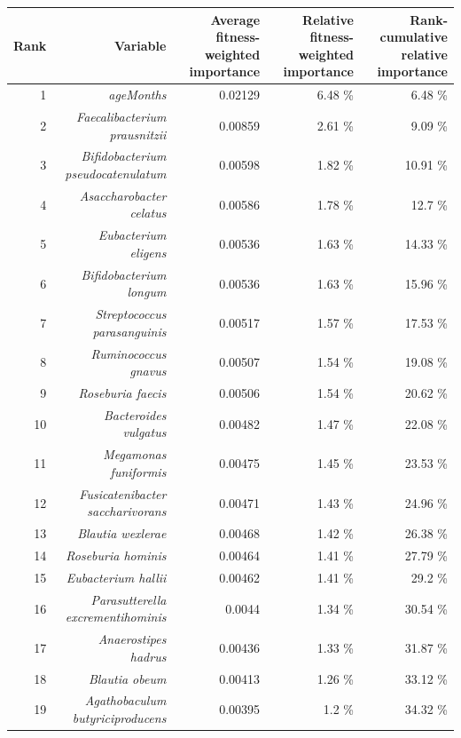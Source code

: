 \documentclass{article}
\begin{document}
\begin{table}[h]
  \begin{centering}
    \tiny
    \begin{tabular}{|r|r|r|r|r|}
      \hline\hline
      \textbf{Rank} & \textbf{Variable} & \textbf{Average fitness-weighted importance} & \textbf{Relative fitness-weighted importance} & \textbf{Rank-cumulative relative importance } \\\hline
      1 & \textit{ageMonths} & 0.02129 & 6.48 \% & 6.48 \% \\
      2 & \textit{Faecalibacterium prausnitzii} & 0.00859 & 2.61 \% & 9.09 \% \\
      3 & \textit{Bifidobacterium pseudocatenulatum} & 0.00598 & 1.82 \% & 10.91 \% \\
      4 & \textit{Asaccharobacter celatus} & 0.00586 & 1.78 \% & 12.7 \% \\
      5 & \textit{Eubacterium eligens} & 0.00536 & 1.63 \% & 14.33 \% \\
      6 & \textit{Bifidobacterium longum} & 0.00536 & 1.63 \% & 15.96 \% \\
      7 & \textit{Streptococcus parasanguinis} & 0.00517 & 1.57 \% & 17.53 \% \\
      8 & \textit{Ruminococcus gnavus} & 0.00507 & 1.54 \% & 19.08 \% \\
      9 & \textit{Roseburia faecis} & 0.00506 & 1.54 \% & 20.62 \% \\
      10 & \textit{Bacteroides vulgatus} & 0.00482 & 1.47 \% & 22.08 \% \\
      11 & \textit{Megamonas funiformis} & 0.00475 & 1.45 \% & 23.53 \% \\
      12 & \textit{Fusicatenibacter saccharivorans} & 0.00471 & 1.43 \% & 24.96 \% \\
      13 & \textit{Blautia wexlerae} & 0.00468 & 1.42 \% & 26.38 \% \\
      14 & \textit{Roseburia hominis} & 0.00464 & 1.41 \% & 27.79 \% \\
      15 & \textit{Eubacterium hallii} & 0.00462 & 1.41 \% & 29.2 \% \\
      16 & \textit{Parasutterella excrementihominis} & 0.0044 & 1.34 \% & 30.54 \% \\
      17 & \textit{Anaerostipes hadrus} & 0.00436 & 1.33 \% & 31.87 \% \\
      18 & \textit{Blautia obeum} & 0.00413 & 1.26 \% & 33.12 \% \\
      19 & \textit{Agathobaculum butyriciproducens} & 0.00395 & 1.2 \% & 34.32 \% \\

\end{tabular}
\end{centering}
\end{table}
\end{document}
